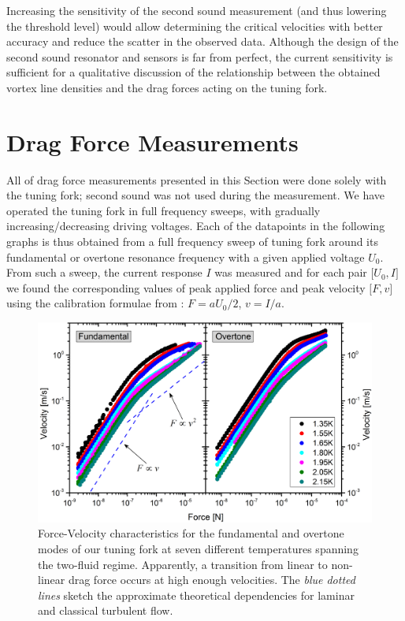 Increasing the sensitivity of the second sound measurement (and thus lowering the threshold level) would allow determining the critical velocities with better accuracy and reduce the scatter in the observed data. Although the design of the second sound resonator and sensors is far from perfect, the current sensitivity is sufficient for a qualitative discussion of the relationship between the obtained vortex line densities and the drag forces acting on the tuning fork.


\newpage

\section{Drag Force Measurements}

All of drag force measurements presented in this Section were done solely with the tuning fork; second sound was not used during the measurement. We have operated the tuning fork in full frequency sweeps, with gradually increasing/decreasing driving voltages. Each of the datapoints in the following graphs is thus obtained from a full frequency sweep of tuning fork around its fundamental or overtone resonance frequency with a given applied voltage $ U_0 $. From such a sweep, the current response $ I $ was measured and for each pair $ \big[U_0,I\big] $ we found the corresponding values of peak applied force and peak velocity $ \big[F,v\big] $ using the calibration formulae from \cite{forks}: $ F = a U_0/2 $, $ v = I/a $.

\begin{figure}[h!]
	\centering
	\includegraphics[width=1\textwidth]{graphs/Merged_v_F}
	\caption{Force-Velocity characteristics for the fundamental and overtone modes of our tuning fork at seven different temperatures spanning the two-fluid regime. Apparently, a transition from linear to non-linear drag force occurs at high enough velocities. The \textit{blue dotted lines} sketch the approximate theoretical dependencies for laminar and classical turbulent flow.}
\end{figure}

